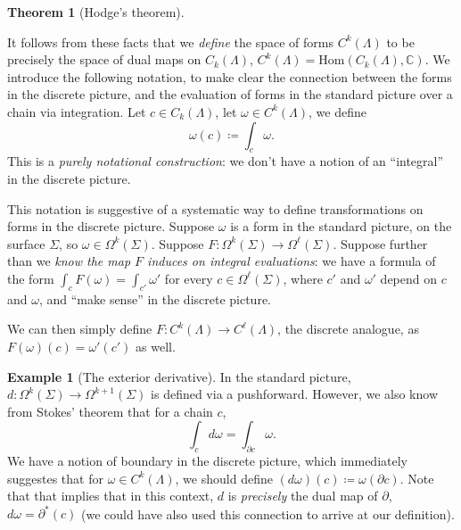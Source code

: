 \documentclass[aps,pra,showpacs,notitlepage,onecolumn,superscriptaddress,nofootinbib]{revtex4-1}
\newcommand{\hhrulefill}{\hspace{-1em} \hrulefill}
\theoremstyle{definition}
\newtheorem{theorem}{Theorem}[section]
\newtheorem{example}{Example}[section]
\begin{document}
\hhrulefill

\begin{theorem}[Hodge's theorem]
\end{theorem}

\noindent It follows from these facts that we \emph{define} the space of forms $C^{k}(\Lambda)$ to be precisely the space of dual maps on $C_k(\Lambda)$, $C^{k}(\Lambda) = \text{Hom}(C_k(\Lambda), \mathbb{C})$.
We introduce the following notation, to make clear the connection between the forms in the discrete picture, and the evaluation of forms in the standard picture over a chain via integration. Let $c \in C_k(\Lambda)$,
let $\omega \in C^{k}(\Lambda)$, we define
\begin{equation}
  \omega(c) \coloneqq \displaystyle\int_{c} \omega.
\end{equation}
This is a \emph{purely notational construction}: we don't have a notion of an ``integral'' in the discrete picture.

This notation is suggestive of a systematic way to define transformations
on forms in the discrete picture. Suppose $\omega$ is a form in the standard picture, on the surface $\Sigma$, so $\omega \in \Omega^{k}(\Sigma)$. Suppose $F : \Omega^{k}(\Sigma) \rightarrow \Omega^{\ell}(\Sigma)$.
Suppose further than we \emph{know the map $F$ induces on integral evaluations}: we have a formula of the form $\int_{c} F(\omega) = \int_{c'} \omega'$ for every $c \in \Omega^{\ell}(\Sigma)$, where $c'$ and $\omega'$
depend on $c$ and $\omega$, and ``make sense'' in the discrete picture.

We can then simply define $F : C^k(\Lambda) \rightarrow C^{\ell}(\Lambda)$, the discrete analogue, as $F(\omega)(c) = \omega'(c')$ as well.

\begin{example}[The exterior derivative]
  In the standard picture, $d : \Omega^{k}(\Sigma) \rightarrow \Omega^{k + 1}(\Sigma)$ is defined via a pushforward. However, we also know from Stokes' theorem
  that for a chain $c$,
  \begin{equation}
    \int_{c} d\omega = \int_{\partial c} \omega.
  \end{equation}
  We have a notion of boundary in the discrete picture, which immediately suggestes that for $\omega \in C^k(\Lambda)$, we should define $(d\omega)(c) \coloneqq \omega(\partial c)$.
  Note that that implies that in this context, $d$ is \emph{precisely} the dual map of $\partial$, $d\omega = \partial^{*}(c)$ (we could have also used this connection to arrive at our definition).
  \end{example}
\end{document}
